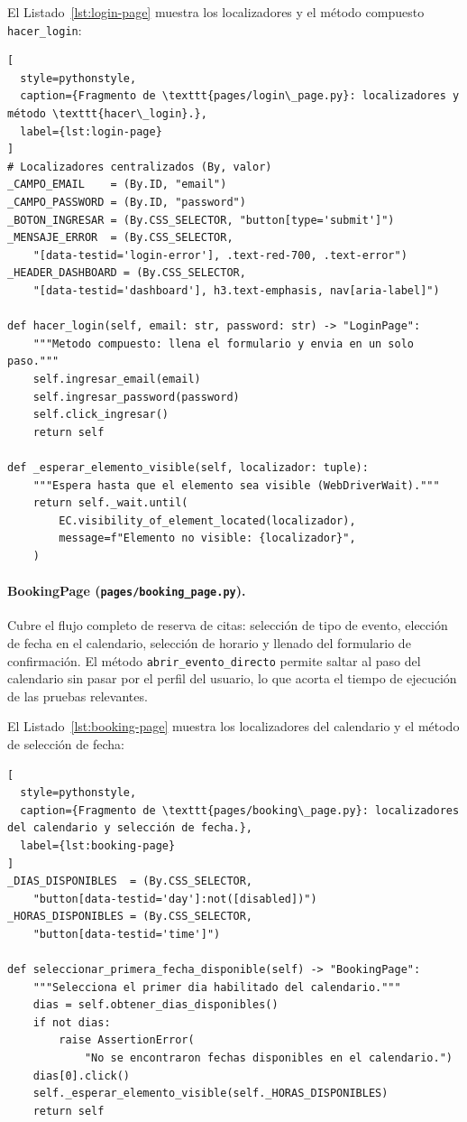 \documentclass{article}
\begin{document}
El Listado~\ref{lst:login-page} muestra los localizadores y el método
compuesto \texttt{hacer\_login}:

\begin{lstlisting}[
  style=pythonstyle,
  caption={Fragmento de \texttt{pages/login\_page.py}: localizadores y método \texttt{hacer\_login}.},
  label={lst:login-page}
]
# Localizadores centralizados (By, valor)
_CAMPO_EMAIL    = (By.ID, "email")
_CAMPO_PASSWORD = (By.ID, "password")
_BOTON_INGRESAR = (By.CSS_SELECTOR, "button[type='submit']")
_MENSAJE_ERROR  = (By.CSS_SELECTOR,
    "[data-testid='login-error'], .text-red-700, .text-error")
_HEADER_DASHBOARD = (By.CSS_SELECTOR,
    "[data-testid='dashboard'], h3.text-emphasis, nav[aria-label]")

def hacer_login(self, email: str, password: str) -> "LoginPage":
    """Metodo compuesto: llena el formulario y envia en un solo paso."""
    self.ingresar_email(email)
    self.ingresar_password(password)
    self.click_ingresar()
    return self

def _esperar_elemento_visible(self, localizador: tuple):
    """Espera hasta que el elemento sea visible (WebDriverWait)."""
    return self._wait.until(
        EC.visibility_of_element_located(localizador),
        message=f"Elemento no visible: {localizador}",
    )
\end{lstlisting}

\paragraph{BookingPage (\texttt{pages/booking\_page.py}).}
Cubre el flujo completo de reserva de citas: selección de tipo de evento,
elección de fecha en el calendario, selección de horario y llenado del
formulario de confirmación. El método \texttt{abrir\_evento\_directo}
permite saltar al paso del calendario sin pasar por el perfil del usuario,
lo que acorta el tiempo de ejecución de las pruebas relevantes.

El Listado~\ref{lst:booking-page} muestra los localizadores del calendario
y el método de selección de fecha:

\begin{lstlisting}[
  style=pythonstyle,
  caption={Fragmento de \texttt{pages/booking\_page.py}: localizadores del calendario y selección de fecha.},
  label={lst:booking-page}
]
_DIAS_DISPONIBLES  = (By.CSS_SELECTOR,
    "button[data-testid='day']:not([disabled])")
_HORAS_DISPONIBLES = (By.CSS_SELECTOR,
    "button[data-testid='time']")

def seleccionar_primera_fecha_disponible(self) -> "BookingPage":
    """Selecciona el primer dia habilitado del calendario."""
    dias = self.obtener_dias_disponibles()
    if not dias:
        raise AssertionError(
            "No se encontraron fechas disponibles en el calendario.")
    dias[0].click()
    self._esperar_elemento_visible(self._HORAS_DISPONIBLES)
    return self
\end{lstlisting}
\end{document}
